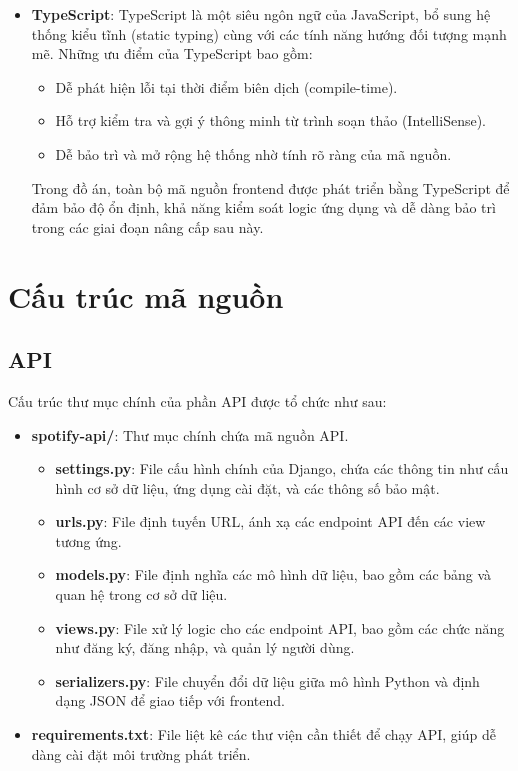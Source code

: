\begin{itemize}
    \item \textbf{TypeScript}:
    TypeScript là một siêu ngôn ngữ của JavaScript, bổ sung hệ thống kiểu tĩnh (static typing) cùng với các tính năng hướng đối tượng mạnh mẽ. Những ưu điểm của TypeScript bao gồm:
    \begin{itemize}
        \item Dễ phát hiện lỗi tại thời điểm biên dịch (compile-time).
        \item Hỗ trợ kiểm tra và gợi ý thông minh từ trình soạn thảo (IntelliSense).
        \item Dễ bảo trì và mở rộng hệ thống nhờ tính rõ ràng của mã nguồn.
    \end{itemize}
    Trong đồ án, toàn bộ mã nguồn frontend được phát triển bằng TypeScript để đảm bảo độ ổn định, khả năng kiểm soát logic ứng dụng và dễ dàng bảo trì trong các giai đoạn nâng cấp sau này.

\end{itemize}


\section{Cấu trúc mã nguồn}
\subsection{API}
Cấu trúc thư mục chính của phần API được tổ chức như sau:
\begin{itemize}
    \item \textbf{spotify-api/}: Thư mục chính chứa mã nguồn API.
    \begin{itemize}
        \item \textbf{settings.py}: File cấu hình chính của Django, chứa các thông tin như cấu hình cơ sở dữ liệu, ứng dụng cài đặt, và các thông số bảo mật.
        \item \textbf{urls.py}: File định tuyến URL, ánh xạ các endpoint API đến các view tương ứng.
        \item \textbf{models.py}: File định nghĩa các mô hình dữ liệu, bao gồm các bảng và quan hệ trong cơ sở dữ liệu.
        \item \textbf{views.py}: File xử lý logic cho các endpoint API, bao gồm các chức năng như đăng ký, đăng nhập, và quản lý người dùng.
        \item \textbf{serializers.py}: File chuyển đổi dữ liệu giữa mô hình Python và định dạng JSON để giao tiếp với frontend.
    \end{itemize}
    \item \textbf{requirements.txt}: File liệt kê các thư viện cần thiết để chạy API, giúp dễ dàng cài đặt môi trường phát triển.
\end{itemize}

